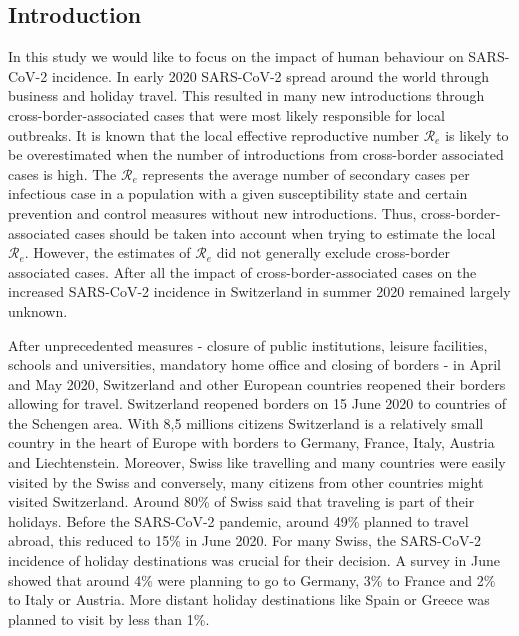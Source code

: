 \documentclass[10pt, a4paper, twoside]{article}
\begin{document}
\begin{multicols}{2}
\section{Introduction}

\lhead{ }
In this study we would like to focus on the impact of human behaviour on SARS-CoV-2 incidence.
In early 2020 SARS-CoV-2 spread around the world through business and holiday travel.\cite{worobey_emergence_2020}
This resulted in many new introductions through cross-border-associated cases that were most likely responsible for local outbreaks.\cite{russell_effect_2021}
It is known that the local effective reproductive number $\mathcal{R}_e$ is likely to be overestimated when the number of introductions from cross-border associated cases is high.\cite{roberts_early_2011}
The $\mathcal{R}_e$ represents the average number of secondary cases per infectious case in a population with a given susceptibility state and certain prevention and control measures without new introductions.
Thus, cross-border-associated cases should be taken into account when trying to estimate the local $\mathcal{R}_e$.
However, the estimates of $\mathcal{R}_e$ did not generally exclude cross-border associated cases.
After all the impact of cross-border-associated cases on the increased SARS-CoV-2 incidence in Switzerland in summer 2020 remained largely unknown.

After unprecedented measures - closure of public institutions, leisure facilities, schools and universities, mandatory home office and closing of borders -  in April and May 2020, Switzerland and other European countries reopened their borders allowing for travel.
Switzerland reopened borders on 15 June 2020 to countries of the Schengen area.\cite{federal_council_coronavirus_2020}
With 8,5 millions citizens Switzerland is a relatively small country in the heart of Europe with borders to Germany, France, Italy, Austria and Liechtenstein.
Moreover, Swiss like travelling and many countries were easily visited by the Swiss and conversely, many citizens from other countries might visited Switzerland.
Around 80\% of Swiss said that traveling is part of their holidays.\cite{heim_dreivon_2020}
Before the SARS-CoV-2 pandemic, around 49\% planned to travel abroad, this reduced to 15\% in June 2020.\cite{bosshardt_schweiz_2020}
For many Swiss, the SARS-CoV-2 incidence of holiday destinations was crucial for their decision.\cite{bosshardt_schweiz_2020}
A survey in June showed that around 4\% were planning to go to Germany, 3\% to France and 2\% to Italy or Austria.\cite{bosshardt_schweiz_2020}
More distant holiday destinations like Spain or Greece was planned to visit by less than 1\%.\cite{bosshardt_schweiz_2020}


\end{multicols}
\end{document}

